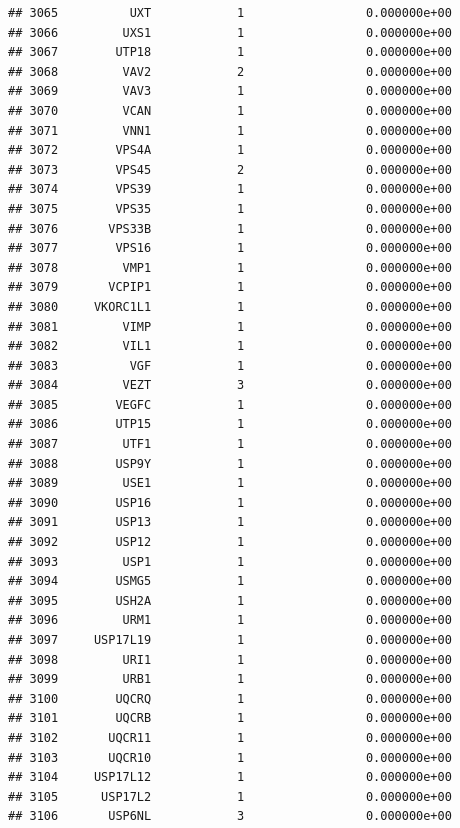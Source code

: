 \documentclass[
]{article}
\begin{document}
\begin{verbatim}
## 3065          UXT            1                 0.000000e+00
## 3066         UXS1            1                 0.000000e+00
## 3067        UTP18            1                 0.000000e+00
## 3068         VAV2            2                 0.000000e+00
## 3069         VAV3            1                 0.000000e+00
## 3070         VCAN            1                 0.000000e+00
## 3071         VNN1            1                 0.000000e+00
## 3072        VPS4A            1                 0.000000e+00
## 3073        VPS45            2                 0.000000e+00
## 3074        VPS39            1                 0.000000e+00
## 3075        VPS35            1                 0.000000e+00
## 3076       VPS33B            1                 0.000000e+00
## 3077        VPS16            1                 0.000000e+00
## 3078         VMP1            1                 0.000000e+00
## 3079       VCPIP1            1                 0.000000e+00
## 3080     VKORC1L1            1                 0.000000e+00
## 3081         VIMP            1                 0.000000e+00
## 3082         VIL1            1                 0.000000e+00
## 3083          VGF            1                 0.000000e+00
## 3084         VEZT            3                 0.000000e+00
## 3085        VEGFC            1                 0.000000e+00
## 3086        UTP15            1                 0.000000e+00
## 3087         UTF1            1                 0.000000e+00
## 3088        USP9Y            1                 0.000000e+00
## 3089         USE1            1                 0.000000e+00
## 3090        USP16            1                 0.000000e+00
## 3091        USP13            1                 0.000000e+00
## 3092        USP12            1                 0.000000e+00
## 3093         USP1            1                 0.000000e+00
## 3094        USMG5            1                 0.000000e+00
## 3095        USH2A            1                 0.000000e+00
## 3096         URM1            1                 0.000000e+00
## 3097     USP17L19            1                 0.000000e+00
## 3098         URI1            1                 0.000000e+00
## 3099         URB1            1                 0.000000e+00
## 3100        UQCRQ            1                 0.000000e+00
## 3101        UQCRB            1                 0.000000e+00
## 3102       UQCR11            1                 0.000000e+00
## 3103       UQCR10            1                 0.000000e+00
## 3104     USP17L12            1                 0.000000e+00
## 3105      USP17L2            1                 0.000000e+00
## 3106       USP6NL            3                 0.000000e+00

\end{verbatim}
\end{document}
